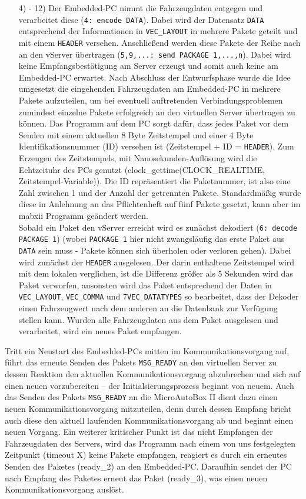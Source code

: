 \documentclass[fontsize = 12pt, paper = a4]{scrreprt}
\begin{document}
\begin{itemize}
\item[4) - 12)]
Der Embedded-PC nimmt die Fahrzeugdaten entgegen und verarbeitet diese (\texttt{4: encode DATA}). Dabei wird der Datensatz \texttt{DATA} entsprechend der Informationen in \texttt{VEC\_LAYOUT} in mehrere Pakete geteilt und mit einem \texttt{HEADER} versehen. Anschließend werden diese Pakete der Reihe nach an den vServer übertragen (\texttt{5,9,...: send PACKAGE 1,...,n}). Dabei wird keine Empfangsbestätigung am Server erzeugt und somit auch keine am Embedded-PC erwartet. 
Nach Abschluss der Entwurfsphase wurde die Idee umgesetzt die eingehenden Fahrzeugdaten am Embedded-PC in mehrere Pakete aufzuteilen, um bei eventuell auftretenden Verbindungsproblemen zumindest einzelne Pakete erfolgreich an den virtuellen Server übertragen zu können. Das Programm auf dem PC sorgt dafür, dass jedes Paket vor dem Senden mit einem aktuellen 8 Byte Zeitstempel und einer 4 Byte Identifikationsnummer (ID) versehen ist (Zeitstempel + ID = \texttt{HEADER}). Zum Erzeugen des Zeitstempels, mit Nanosekunden-Auflösung wird die Echtzeituhr des PCs genutzt (clock\_gettime(CLOCK\_REALTIME, Zeitstempel-Variable)). Die ID repräsentiert die Paketnummer, ist also eine Zahl zwischen 1 und der Anzahl der getrennten Pakete. Standardmäßig wurde diese in Anlehnung an das Pflichtenheft auf fünf Pakete gesetzt, kann aber im mabxii Programm geändert werden. \\
Sobald ein Paket den vServer erreicht wird es zunächst dekodiert (\texttt{6: decode PACKAGE 1}) (wobei \texttt{PACKAGE 1} hier nicht zwangsläufig das erste Paket aus \texttt{DATA} sein muss - Pakete können sich überholen oder verloren gehen). Dabei wird zunächst der \texttt{HEADER} ausgelesen. Der darin enthaltene Zeitstempel wird mit dem lokalen verglichen, ist die Differenz größer als 5 Sekunden wird das Paket verworfen, ansonsten wird das Paket entsprechend der Daten in \texttt{VEC\_LAYOUT}, \texttt{VEC\_COMMA} und 7\texttt{VEC\_DATATYPES} so bearbeitet, dass der Dekoder einen Fahrzeugwert nach dem anderen an die Datenbank zur Verfügung stellen kann. Wurden alle Fahrzeugdaten aus dem Paket ausgelesen und verarbeitet, wird ein neues Paket empfangen. 

\end{itemize}

Tritt ein Neustart des Embedded-PCs mitten im Kommunikationsvorgang auf, führt das erneute Senden des Pakets \texttt{MSG\_READY} an den virtuellen Server zu dessen Reaktion den aktuellen Kommunikationsvorgang abzubrechen und sich auf einen neuen vorzubereiten -- der Initialsierungsprozess beginnt von neuem. Auch das Senden des Pakets \texttt{MSG\_READY} an die MicroAutoBox II dient dazu einen neuen Kommunikationsvorgang mitzuteilen, denn durch dessen Empfang bricht auch diese den aktuell laufenden Kommunikationsvorgang ab und beginnt einen neuen Vorgang. Ein weiterer kritischer Punkt ist das nicht Empfangen der Fahrzeugdaten des Servers, wird das Programm nach einem von uns festgelegten Zeitpunkt (timeout X) keine Pakete empfangen, reagiert es durch ein erneutes Senden des Paketes (ready\_2) an den Embedded-PC. Daraufhin sendet der PC nach Empfang des Paketes erneut das Paket (ready\_3), was einen neuen Kommunikationsvorgang auslöst. 
\end{document}
